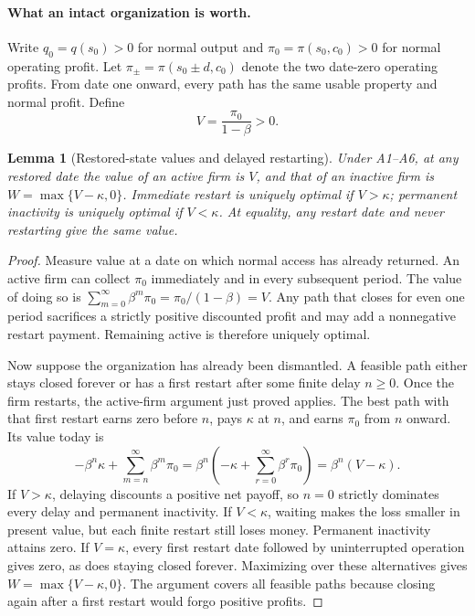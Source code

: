 \documentclass[11pt,letterpaper]{article}
\newtheorem{lemma}{Lemma}
\begin{document}
\paragraph{What an intact organization is worth.}
Write $q_0=q(s_0)>0$ for normal output and $\pi_0=\pi(s_0,c_0)>0$ for normal operating profit. Let $\pi_\pm=\pi(s_0\pm d,c_0)$ denote the two date-zero operating profits. From date one onward, every path has the same usable property and normal profit. Define
\begin{equation}\label{eq:V}V=\frac{\pi_0}{1-\beta}>0.\end{equation}
\begin{lemma}[Restored-state values and delayed restarting]\label{lem:value}
Under A1--A6, at any restored date the value of an active firm is $V$, and that of an inactive firm is $W=\max\{V-\kappa,0\}$. Immediate restart is uniquely optimal if $V>\kappa$; permanent inactivity is uniquely optimal if $V<\kappa$. At equality, any restart date and never restarting give the same value.
\end{lemma}
\begin{proof}
Measure value at a date on which normal access has already returned. An active firm can collect $\pi_0$ immediately and in every subsequent period. The value of doing so is $\sum_{m=0}^\infty\beta^m\pi_0=\pi_0/(1-\beta)=V$. Any path that closes for even one period sacrifices a strictly positive discounted profit and may add a nonnegative restart payment. Remaining active is therefore uniquely optimal.

Now suppose the organization has already been dismantled. A feasible path either stays closed forever or has a first restart after some finite delay $n\geq0$. Once the firm restarts, the active-firm argument just proved applies. The best path with that first restart earns zero before $n$, pays $\kappa$ at $n$, and earns $\pi_0$ from $n$ onward. Its value today is
\[
 -\beta^n\kappa+\sum_{m=n}^{\infty}\beta^m\pi_0
 =\beta^n\left(-\kappa+\sum_{r=0}^{\infty}\beta^r\pi_0\right)
 =\beta^n(V-\kappa).
\]
If $V>\kappa$, delaying discounts a positive net payoff, so $n=0$ strictly dominates every delay and permanent inactivity. If $V<\kappa$, waiting makes the loss smaller in present value, but each finite restart still loses money. Permanent inactivity attains zero. If $V=\kappa$, every first restart date followed by uninterrupted operation gives zero, as does staying closed forever. Maximizing over these alternatives gives $W=\max\{V-\kappa,0\}$. The argument covers all feasible paths because closing again after a first restart would forgo positive profits.
\end{proof}
\end{document}
